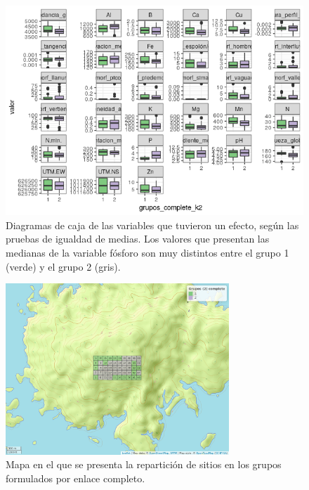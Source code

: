 \documentclass[11pt,]{article}
\begin{document}
\begin{figure}
\centering
\includegraphics{diagrama_caja_igualdad_medias_complete.png}
\caption{Diagramas de caja de las variables que tuvieron un efecto,
según las pruebas de igualdad de medias. Los valores que presentan las
medianas de la variable fósforo son muy distintos entre el grupo 1
(verde) y el grupo 2 (gris).
\label{fig:diagrama_caja_igualdad_medias_complete}}
\end{figure}

\begin{figure}
\centering
\includegraphics[width=0.75000\textwidth]{mapa_complete_k2.png}
\caption{Mapa en el que se presenta la repartición de sitios en los
grupos formulados por enlace completo. \label{fig:mapa_complete_k2}}
\end{figure}
\end{document}

